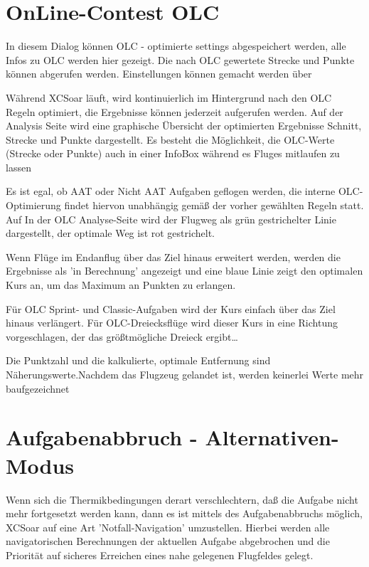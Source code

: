 \section{OnLine-Contest OLC}

In diesem Dialog können OLC - optimierte settings abgespeichert werden, alle Infos zu OLC werden hier gezeigt. Die nach OLC gewertete Strecke und Punkte können abgerufen werden. Einstellungen können gemacht werden über   

Während \textsf{XCSoar} läuft, wird kontinuierlich im Hintergrund nach den OLC Regeln optimiert, die Ergebnisse können  jederzeit  aufgerufen werden.
Auf der Analysis Seite wird eine graphische Übersicht der optimierten Ergebnisse Schnitt, Strecke und Punkte dargestellt.  Es besteht die Möglichkeit, die OLC-Werte (Strecke oder Punkte) auch in einer InfoBox während es Fluges mitlaufen zu lassen

Es ist egal, ob AAT oder Nicht AAT Aufgaben geflogen werden, die interne OLC-Optimierung findet hiervon unabhängig gemäß der vorher gewählten Regeln statt.  Auf In der OLC Analyse-Seite wird der Flugweg als grün gestrichelter Linie dargestellt, der optimale Weg ist rot gestrichelt.

Wenn Flüge im Endanflug über das Ziel hinaus erweitert werden, werden die Ergebnisse als 'in Berechnung' angezeigt und eine blaue Linie zeigt den optimalen Kurs an, um das Maximum an Punkten zu erlangen.

Für OLC Sprint- und Classic-Aufgaben wird der Kurs einfach über das Ziel hinaus verlängert.  Für OLC-Dreiecksflüge wird dieser Kurs in eine Richtung vorgeschlagen, der das größtmögliche Dreieck ergibt\dots

Die Punktzahl und die kalkulierte, optimale Entfernung sind Näherungswerte.Nachdem das Flugzeug gelandet ist, werden keinerlei Werte mehr baufgezeichnet

\section{Aufgabenabbruch - Alternativen-Modus}

Wenn sich die Thermikbedingungen derart verschlechtern, daß die Aufgabe nicht mehr fortgesetzt werden kann,
dann es ist mittels des Aufgabenabbruchs möglich, \textsf{XCSoar} auf eine Art 'Notfall-Navigation' umzustellen.
Hierbei werden alle navigatorischen Berechnungen der aktuellen Aufgabe abgebrochen und die Priorität auf sicheres Erreichen eines nahe gelegenen Flugfeldes gelegt.

